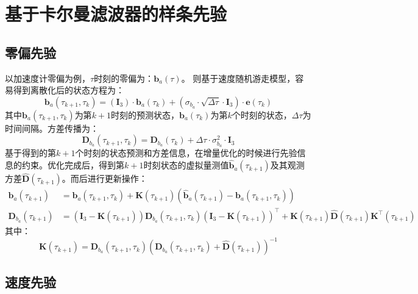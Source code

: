\documentclass[12pt, onecolumn]{article}
\newcommand\normf{\fangsong}
\begin{document}
	\section{\normf 基于卡尔曼滤波器的样条先验}
	\subsection{\normf 零偏先验}
	以加速度计零偏为例，$\tau$时刻的零偏为：$\boldsymbol{b}_a(\tau)$。
	则基于速度随机游走模型，容易得到离散化后的状态方程为：
	\begin{equation}
	\boldsymbol{b}_a(\tau_{k+1},\tau_k)=
	\left( \boldsymbol{I}_3\right) \cdot\boldsymbol{b}_a(\tau_{k})
	+\left( \sigma_{b_a}\cdot\sqrt{\Delta \tau}\cdot\boldsymbol{I}_3\right) \cdot\boldsymbol{e}(\tau_k)
	\end{equation}
	其中$\boldsymbol{b}_a(\tau_{k+1},\tau_k)$为第$k+1$时刻的预测状态，$\boldsymbol{b}_a(\tau_{k})$为第$k$个时刻的状态，$\Delta \tau$为时间间隔。方差传播为：
	\begin{equation}
	\boldsymbol{D}_{b_a}(\tau_{k+1},\tau_k)=\boldsymbol{D}_{b_a}(\tau_{k})+\Delta\tau\cdot\sigma_{b_a}^2\cdot\boldsymbol{I}_3
	\end{equation}
	基于得到的第$k+1$个时刻的状态预测和方差信息，在增量优化的时候进行先验信息的约束。优化完成后，得到第$k+1$时刻状态的虚拟量测值$\hat{\boldsymbol{b}}_a(\tau_{k+1})$及其观测方差$\hat{\boldsymbol{D}}(\tau_{k+1})$。而后进行更新操作：
	\begin{equation}
	\begin{aligned}
	\boldsymbol{b}_a(\tau_{k+1})&=\boldsymbol{b}_a(\tau_{k+1},\tau_k)+\boldsymbol{K}(\tau_{k+1})\left(
		\hat{\boldsymbol{b}}_a(\tau_{k+1})-\boldsymbol{b}_a(\tau_{k+1},\tau_k)
		\right) 
		\\
		\boldsymbol{D}_{b_a}(\tau_{k+1})&=\left( \boldsymbol{I}_3-\boldsymbol{K}(\tau_{k+1})\right) \boldsymbol{D}_{b_a}(\tau_{k+1},\tau_k)\left( \boldsymbol{I}_3-\boldsymbol{K}(\tau_{k+1})\right)^\top
		+\boldsymbol{K}(\tau_{k+1})\hat{\boldsymbol{D}}(\tau_{k+1})\boldsymbol{K}^\top(\tau_{k+1})
	\end{aligned}
	\end{equation}
	其中：
	\begin{equation}
	\boldsymbol{K}(\tau_{k+1})=\boldsymbol{D}_{b_a}(\tau_{k+1},\tau_k)\left(\boldsymbol{D}_{b_a}(\tau_{k+1},\tau_k)+\hat{\boldsymbol{D}}(\tau_{k+1}) \right)^{-1}
	\end{equation}
	\subsection{\normf 速度先验}
	
\end{document}
